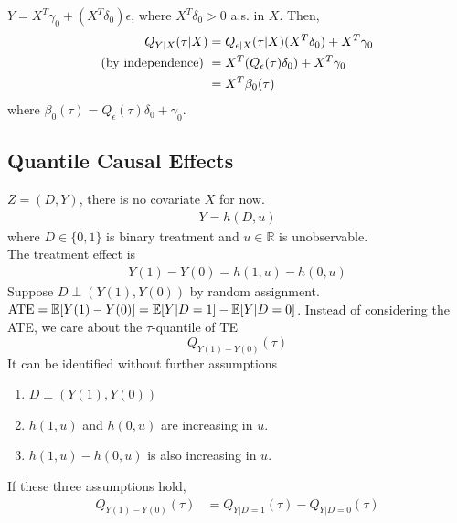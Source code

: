 \documentclass[11pt]{elegantbook}
\begin{document}
\begin{example}
    $Y=X^T\gamma_0+(X^T\delta_0)\epsilon$, where $X^T\delta_0>0$ a.s. in $X$. Then,
    \begin{equation}
        \begin{aligned}
            Q_{Y|X}(\tau|X)&=Q_{\epsilon|X}(\tau|X)(X^T\delta_0)+X^T\gamma_0\\
            \textnormal{(by independence) }&=X^T(Q_\epsilon(\tau)\delta_0)+X^T\gamma_0\\
            &=X^T\beta_0(\tau)
        \end{aligned}
        \nonumber
    \end{equation}
    where $\beta_0(\tau)=Q_\epsilon(\tau)\delta_0+\gamma_0$.
\end{example}

\subsection{Quantile Causal Effects}
$Z=(D,Y)$, there is no covariate $X$ for now.
\begin{equation}
    \begin{aligned}
        Y=h(D,u)
    \end{aligned}
    \nonumber
\end{equation}
where $D\in\{0,1\}$ is binary treatment and $u\in \mathbb{R}$ is unobservable.\\
The treatment effect is
\begin{equation}
    \begin{aligned}
        Y(1)-Y(0)=h(1,u)-h(0,u)
    \end{aligned}
    \nonumber
\end{equation}
Suppose $D\perp (Y(1),Y(0))$ by random assignment. $\textnormal{ATE}=\mathbb{E}[Y(1)-Y(0)]=\mathbb{E}[Y|D=1]-\mathbb{E}[Y|D=0]$. Instead of considering the ATE, we care about the $\tau$-quantile of TE $$Q_{Y(1)-Y(0)}(\tau)$$
It can be identified without further assumptions
\begin{assumption}
    \begin{enumerate}[{A}1.]
        \item $D\perp (Y(1),Y(0))$
        \item $h(1,u)$ and $h(0,u)$ are increasing in $u$.
        \item $h(1,u)-h(0,u)$ is also increasing in $u$.
    \end{enumerate}
\end{assumption}
\begin{theorem}
    If these three assumptions hold,
    \begin{equation}
        \begin{aligned}
            Q_{Y(1)-Y(0)}(\tau)&=Q_{Y|D=1}(\tau)-Q_{Y|D=0}(\tau)
        \end{aligned}
        \nonumber
    \end{equation}
\end{theorem}
\end{document}
